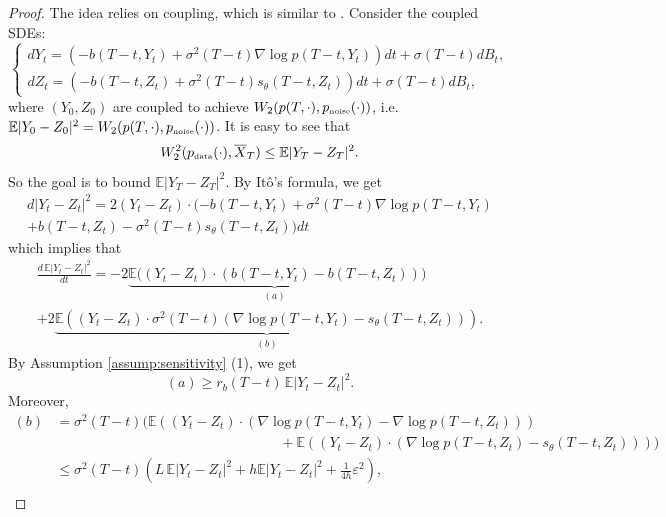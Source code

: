 \documentclass[letterpaper,11pt,reqno]{amsart}
\numberwithin{equation}{section}
\begin{document}
 \begin{proof}
The idea relies on coupling, which is similar to \cite[Lemma 4]{ZTY23}.
Consider the coupled SDEs:
\begin{equation*}
\left\{ \begin{array}{lcl}
d Y_t = \left(-b(T-t, Y_t) + \sigma^2(T-t) \nabla \log p(T-t, Y_t) \right) dt+ \sigma(T-t) dB_t, \\
d Z_t =  \left(-b(T-t, Z_t) + \sigma^2(T-t)s_\theta(T-t, Z_t) \right) dt+ \sigma(T-t) dB_t,
\end{array}\right.
\end{equation*}
where $(Y_0, Z_0)$ are coupled to achieve $W_2(p(T,\cdot), p_{\tiny \mbox{noise}}(\cdot))$,
i.e. $\mathbb{E}|Y_0 - Z_0|^2=W_2(p(T,\cdot), p_{\tiny \mbox{noise}}(\cdot))$. 
It is easy to see that
\begin{equation}
\label{eq:W2}
W_2^2(p_{\tiny \mbox{data}}(\cdot), \overline{X}_T) \le \mathbb{E}|Y_T - Z_T|^2.
\end{equation}
So the goal is to bound $\mathbb{E}|Y_T - Z_T|^2$. 
By It\^o's formula, we get
\begin{multline*}
d|Y_t - Z_t|^2 = 2(Y_t - Z_t) \cdot (-b(T-t, Y_t) + \sigma^2(T-t) \nabla \log p(T-t, Y_t) \\ + b(T-t, Z_t) - \sigma^2(T-t)s_\theta(T-t, Z_t)) dt
\end{multline*}
which implies that 
\begin{multline}
\label{eq:diff}
\frac{d \, \mathbb{E}|Y_t - Z_t|^2}{dt} 
= -2 \underbrace{\mathbb{E}((Y_t - Z_t) \cdot (b(T-t, Y_t) - b(T-t, Z_t))}_{(a)}) \\
+ 2 \underbrace{\mathbb{E}((Y_t - Z_t) \cdot \sigma^2(T-t) (\nabla \log p(T-t, Y_t) - s_\theta(T-t, Z_t)))}_{(b)}.
\end{multline}
By Assumption \ref{assump:sensitivity} (1), we get
\begin{equation}
\label{eq:terma}
(a) \ge r_b(T-t) \, \mathbb{E}|Y_t - Z_t|^2.
\end{equation}
Moreover,
\begin{equation}
\label{eq:termb}
\begin{aligned}
(b) & = \sigma^2(T-t) \bigg( \mathbb{E}((Y_t - Z_t) \cdot (\nabla \log p(T-t, Y_t) - \nabla \log p (T-t, Z_t))) \\
& \qquad \qquad \qquad \qquad \qquad \qquad \qquad \qquad + \mathbb{E}((Y_t - Z_t) \cdot (\nabla \log p (T-t, Z_t) - s_{\theta}(T-t, Z_t))) \bigg)\\
&  \le  \sigma^2(T-t) \left( L\, \mathbb{E}|Y_t - Z_t|^2 + h \mathbb{E}|Y_t - Z_t|^2 + \frac{1}{4h} \varepsilon^2\right), \\

\end{aligned}
\end{equation}
\end{proof}
\end{document}
